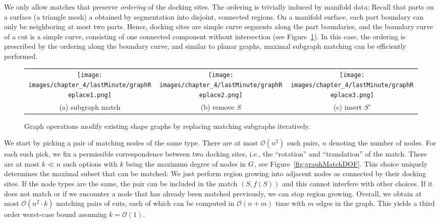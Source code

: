 We only allow  matches that preserve {\em ordering} of the docking sites. The ordering is trivially induced by manifold data: Recall that parts on a surface (a triangle mesh) a obtained by segmentation into disjoint, connected regions. On a manifold surface, each part boundary can only be neighboring at most two parts. Hence, docking sites are simple curve segments along the part boundaries, and the boundary curve of a cut is a simple curve, consisting of one connected component without intersection (see Figure~\ref{fig:graphReplace1}). In this case, the ordering is prescribed by the ordering along the boundary curve, and similar to planar graphs, maximal subgraph matching can be efficiently performed.

\begin{figure}[h!]
	\centering
	\begin{tabular}{ccc}
		\texttt{[image: images/chapter\_4/lastMinute/graphReplace1.png]} &
		\texttt{[image: images/chapter\_4/lastMinute/graphReplace2.png]} &
		\texttt{[image: images/chapter\_4/lastMinute/graphReplace3.png]} \\
		\small (a) subgraph match &
		\small (b) remove $S$ &
		\small (c) insert $S'$
	\end{tabular}
	\caption{Graph operations modify existing shape graphs by replacing matching subgraphs iteratively.}
\vnudge
	\label{fig:graphReplace1}
\end{figure}


We start by picking a pair of matching nodes of the same type. There are at most $\mathcal{O}(n^2)$ such pairs, $n$ denoting the number of nodes. For each such pick, we fix a permissible correspondence between two docking sites, i.e., the ``rotation'' and ``translation'' of the match. There are at most $k \ll n$ such options with $k$ being the maximum degree of nodes in $G$, see Figure~\ref{fig:graphMatchDOF}. This choice uniquely determines the maximal subset that can be matched: We just perform region growing into adjacent nodes as connected by their docking sites. If the node types are the same, the pair can be included in the match $(S,f(S))$ and this cannot interfere with other choices. If it does not match or if we encounter a node that has already been matched previously, we can stop region growing. Overall, we obtain at most $\mathcal{O}(n^2 \cdot k)$ matching pairs of cuts, each of which can be computed in $\mathcal{O}(n+m)$ time with $m$ edges in the graph. This yields a third order worst-case bound assuming $k = \mathcal{O}(1)$.

